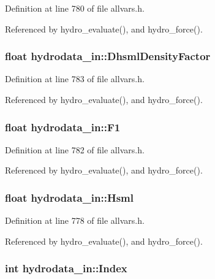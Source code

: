 Definition at line 780 of file allvars.h.



Referenced by hydro\_\-evaluate(), and hydro\_\-force().

\hypertarget{structhydrodata__in_ad2da50b0d4b51a53f9fb5cb4c41f20b8}{
\subsubsection[{DhsmlDensityFactor}]{\setlength{\rightskip}{0pt plus 5cm}float {\bf hydrodata\_\-in::DhsmlDensityFactor}}}
\label{structhydrodata__in_ad2da50b0d4b51a53f9fb5cb4c41f20b8}


Definition at line 783 of file allvars.h.



Referenced by hydro\_\-evaluate(), and hydro\_\-force().

\hypertarget{structhydrodata__in_a2b0cc9653b307eac998cec7175036b20}{
\subsubsection[{F1}]{\setlength{\rightskip}{0pt plus 5cm}float {\bf hydrodata\_\-in::F1}}}
\label{structhydrodata__in_a2b0cc9653b307eac998cec7175036b20}


Definition at line 782 of file allvars.h.



Referenced by hydro\_\-evaluate(), and hydro\_\-force().

\hypertarget{structhydrodata__in_ae24f9ceb40451913af1ab6e793772bdd}{
\subsubsection[{Hsml}]{\setlength{\rightskip}{0pt plus 5cm}float {\bf hydrodata\_\-in::Hsml}}}
\label{structhydrodata__in_ae24f9ceb40451913af1ab6e793772bdd}


Definition at line 778 of file allvars.h.



Referenced by hydro\_\-evaluate(), and hydro\_\-force().

\hypertarget{structhydrodata__in_a630be87b2fd46a0e22f57bde1a48e015}{
\subsubsection[{Index}]{\setlength{\rightskip}{0pt plus 5cm}int {\bf hydrodata\_\-in::Index}}}
\label{structhydrodata__in_a630be87b2fd46a0e22f57bde1a48e015}


